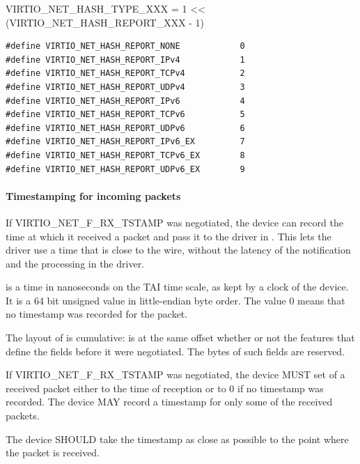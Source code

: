 VIRTIO_NET_HASH_TYPE_XXX = 1 << (VIRTIO_NET_HASH_REPORT_XXX - 1)

\begin{lstlisting}
#define VIRTIO_NET_HASH_REPORT_NONE            0
#define VIRTIO_NET_HASH_REPORT_IPv4            1
#define VIRTIO_NET_HASH_REPORT_TCPv4           2
#define VIRTIO_NET_HASH_REPORT_UDPv4           3
#define VIRTIO_NET_HASH_REPORT_IPv6            4
#define VIRTIO_NET_HASH_REPORT_TCPv6           5
#define VIRTIO_NET_HASH_REPORT_UDPv6           6
#define VIRTIO_NET_HASH_REPORT_IPv6_EX         7
#define VIRTIO_NET_HASH_REPORT_TCPv6_EX        8
#define VIRTIO_NET_HASH_REPORT_UDPv6_EX        9
\end{lstlisting}

\paragraph{Timestamping for incoming packets}
\label{sec:Device Types / Network Device / Device Operation / Processing of Incoming Packets / Timestamping for incoming packets}

If VIRTIO_NET_F_RX_TSTAMP was negotiated, the device can record the time at
which it received a packet and pass it to the driver in . This
lets the driver use a time that is close to the wire, without the latency of
the notification and the processing in the driver.

 is a time in nanoseconds on the TAI time scale, as
kept by a clock of the device. It is a 64 bit unsigned value in little-endian
byte order. The value 0 means that no timestamp was recorded for the packet.

\begin{note}
The layout of  is cumulative: 
is at the same offset whether or not the features that define the fields before
it were negotiated. The bytes of such fields are reserved.
\end{note}


If VIRTIO_NET_F_RX_TSTAMP was negotiated, the device MUST set
 of a received packet either to the time of reception or to 0
if no timestamp was recorded. The device MAY record a timestamp for only some
of the received packets.

The device SHOULD take the timestamp as close as possible to the point where the
packet is received.

